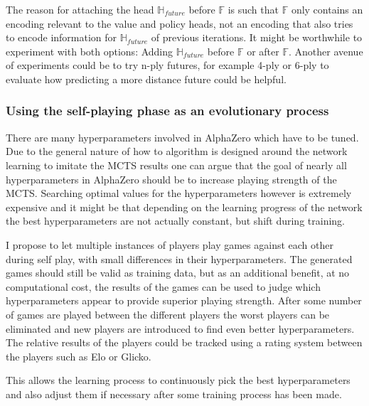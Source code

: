 \documentclass[12pt,onecolumn,oneside,titlepage]{article}
\begin{document}
The reason for attaching the head $\mathbb{H}_{future}$ before $\mathbb{F}$ is such that $\mathbb{F}$ only contains an encoding relevant to the value and policy heads, not an encoding that also tries to encode information for $\mathbb{H}_{future}$ of previous iterations.
It might be worthwhile to experiment with both options: Adding $\mathbb{H}_{future}$ before $\mathbb{F}$ or after $\mathbb{F}$.
Another avenue of experiments could be to try n-ply futures, for example 4-ply or 6-ply to evaluate how predicting a more distance future could be helpful.

\subsubsection{Using the self-playing phase as an evolutionary process}

There are many hyperparameters involved in AlphaZero which have to be tuned. Due to the general nature of how to algorithm is designed around the network learning to imitate the MCTS results one can argue that the goal of
nearly all hyperparameters in AlphaZero should be to increase playing strength of the MCTS. Searching optimal values for the hyperparameters however is extremely expensive and it might be that depending on the learning progress of the network 
the best hyperparameters are not actually constant, but shift during training.

I propose to let multiple instances of players play games against each other during self play, with small differences in their hyperparameters. The generated games should still be valid as training data, but as an additional benefit, at no computational cost,
the results of the games can be used to judge which hyperparameters appear to provide superior playing strength. After some number of games are played between the different players the worst players can be eliminated and new players are introduced to find even better hyperparameters.
The relative results of the players could be tracked using a rating system between the players such as Elo or Glicko.

This allows the learning process to continuously pick the best hyperparameters and also adjust them if necessary after some training process has been made.





\end{document}
